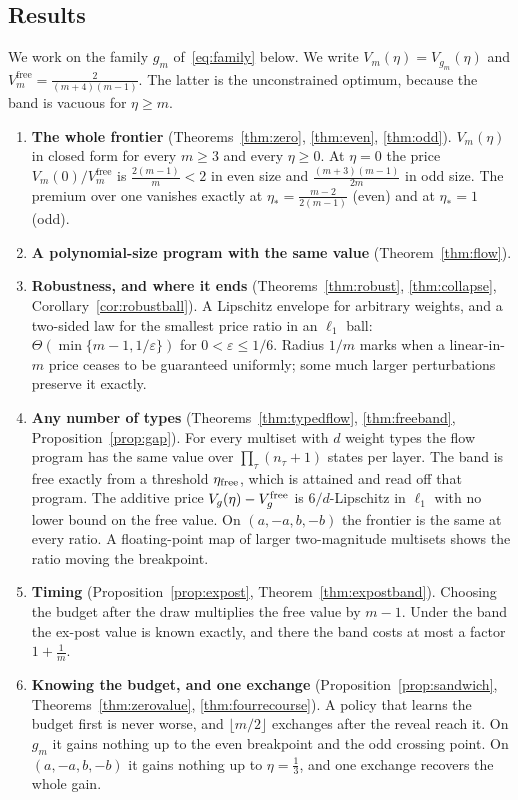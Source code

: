 \subsection{Results}

We work on the family $g_{m}$ of~\eqref{eq:family} below. We write
$V_{m}(\eta)=V_{g_{m}}(\eta)$ and $V^{\mathrm{free}}_{m}=\frac{2}{(m+4)(m-1)}$. The latter is
the unconstrained optimum, because the band is vacuous for $\eta\ge m$.

\begin{enumerate}
\item[1)] \textbf{The whole frontier} (Theorems~\ref{thm:zero}, \ref{thm:even},
\ref{thm:odd}). $V_{m}(\eta)$ in closed form for every $m\ge3$ and every $\eta\ge0$. At
$\eta=0$ the price $V_{m}(0)/V^{\mathrm{free}}_{m}$ is $\frac{2(m-1)}{m}<2$ in even size and
$\frac{(m+3)(m-1)}{2m}$ in odd size. The premium over one vanishes exactly at $\eta_{*}=\frac{m-2}{2(m-1)}$
(even) and at $\eta_{*}=1$ (odd).
\item[2)] \textbf{A polynomial-size program with the same value} (Theorem~\ref{thm:flow}).
\item[3)] \textbf{Robustness, and where it ends} (Theorems~\ref{thm:robust},
\ref{thm:collapse}, Corollary~\ref{cor:robustball}). A Lipschitz envelope for arbitrary
weights, and a two-sided law for the smallest price ratio in an $\ell_1$ ball:
$\Theta(\min\{m-1,1/\varepsilon\})$ for $0<\varepsilon\le1/6$.
Radius $1/m$ marks when a linear-in-$m$ price ceases to be guaranteed uniformly;
some much larger perturbations preserve it exactly.
\item[4)] \textbf{Any number of types} (Theorems~\ref{thm:typedflow}, \ref{thm:freeband},
Proposition~\ref{prop:gap}). For every multiset with $d$ weight types the flow program has the
same value over $\prod_\tau(n_\tau+1)$ states per layer. The band is free exactly from a threshold
$\eta_{\rm free}$, which is attained and read off that program. The additive price
$V_g(\eta)-V^{\rm free}_g$ is $6/d$-Lipschitz in $\ell_1$ with no lower bound on the free value.
On $(a,-a,b,-b)$ the frontier is the same at every ratio. A floating-point map of larger
two-magnitude multisets shows the ratio moving the breakpoint.
\item[5)] \textbf{Timing} (Proposition~\ref{prop:expost}, Theorem~\ref{thm:expostband}).
Choosing the budget after the draw multiplies the free value by $m-1$. Under the band the
ex-post value is known exactly, and there the band costs at most a factor $1+\frac1m$.
\item[6)] \textbf{Knowing the budget, and one exchange} (Proposition~\ref{prop:sandwich},
Theorems~\ref{thm:zerovalue}, \ref{thm:fourrecourse}). A policy that learns the budget first
is never worse, and $\lfloor m/2\rfloor$ exchanges after the reveal reach it. On $g_m$ it gains
nothing up to the even breakpoint and the odd crossing point. On $(a,-a,b,-b)$ it gains nothing
up to $\eta=\frac13$, and one exchange recovers the whole gain.
\end{enumerate}

